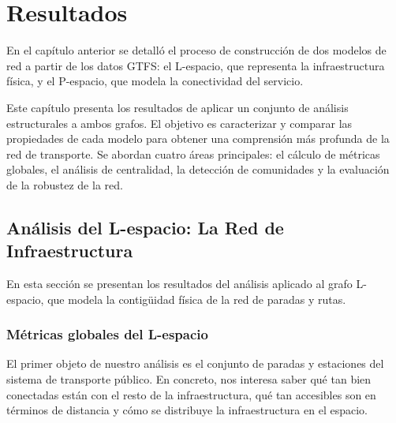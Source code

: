 \chapter{Resultados}

    En el capítulo anterior se detalló el proceso de construcción de dos modelos de red a partir de los datos GTFS: el L-espacio, que representa la infraestructura física, y el P-espacio, que modela la conectividad del servicio.

    Este capítulo presenta los resultados de aplicar un conjunto de análisis estructurales a ambos grafos. El objetivo es caracterizar y comparar las propiedades de cada modelo para obtener una comprensión más profunda de la red de transporte. Se abordan cuatro áreas principales: el cálculo de métricas globales, el análisis de centralidad, la detección de comunidades y la evaluación de la robustez de la red.


    \section{Análisis del L-espacio: La Red de Infraestructura}
        En esta sección se presentan los resultados del análisis aplicado al grafo L-espacio, que modela la contigüidad física de la red de paradas y rutas.

        \subsection{Métricas globales del L-espacio}
        El primer objeto de nuestro análisis es el conjunto de paradas y estaciones del sistema de transporte público. En concreto, nos interesa saber qué tan bien conectadas están con el resto de la infraestructura, qué tan accesibles son en términos de distancia y cómo se distribuye la infraestructura en el espacio.

